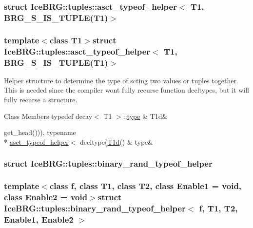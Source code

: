 \subsubsection{struct Ice\+B\+R\+G\+:\+:tuples\+:\+:asct\+\_\+typeof\+\_\+helper$<$ T1, B\+R\+G\+\_\+\+S\+\_\+\+I\+S\+\_\+\+T\+U\+P\+L\+E(T1)$>$}
\subsubsection*{template$<$class T1$>$struct Ice\+B\+R\+G\+::tuples\+::asct\+\_\+typeof\+\_\+helper$<$ T1, B\+R\+G\+\_\+\+S\+\_\+\+I\+S\+\_\+\+T\+U\+P\+L\+E(\+T1)$>$}

Helper structure to determine the type of scting two values or tuples together. This is needed since the compiler won\textquotesingle{}t fully recurse function decltypes, but it will fully recurse a structure. \begin{DoxyFields}{Class Members}
\hypertarget{namespaceIceBRG_1_1tuples_a727efa761d29eff947b1da46427e5bf8}{}typedef decay$<$ T1 $>$\+::\hyperlink{namespaceIceBRG_1_1tuples_a1d496189651c53e9d2271ac49e503c2a}{type}\label{namespaceIceBRG_1_1tuples_a727efa761d29eff947b1da46427e5bf8}
&
T1d&
\\
\hline

\hypertarget{namespaceIceBRG_1_1tuples_a1d496189651c53e9d2271ac49e503c2a}{}get\+\_\+head())), typename \\*
\hyperlink{namespaceIceBRG_1_1tuples_structIceBRG_1_1tuples_1_1asct__typeof__helper}{asct\+\_\+typeof\+\_\+helper}$<$ decltype(\hyperlink{namespaceIceBRG_1_1tuples_a727efa761d29eff947b1da46427e5bf8}{T1d}()\label{namespaceIceBRG_1_1tuples_a1d496189651c53e9d2271ac49e503c2a}
&
type&
\\
\hline

\end{DoxyFields}
\label{structIceBRG_1_1tuples_1_1binary__rand__typeof__helper}
\hypertarget{namespaceIceBRG_1_1tuples_structIceBRG_1_1tuples_1_1binary__rand__typeof__helper}{}
\subsubsection{struct Ice\+B\+R\+G\+:\+:tuples\+:\+:binary\+\_\+rand\+\_\+typeof\+\_\+helper}
\subsubsection*{template$<$class f, class T1, class T2, class Enable1 = void, class Enable2 = void$>$struct Ice\+B\+R\+G\+::tuples\+::binary\+\_\+rand\+\_\+typeof\+\_\+helper$<$ f, T1, T2, Enable1, Enable2 $>$}

